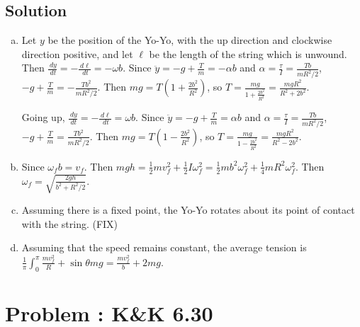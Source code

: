 \documentclass[solutions]{esg8012pset}
\renewcommand{\d}{\,d}
\begin{document}
\subsection{Solution}
  \begin{enumerate}[(a)]
    \item Let $y$ be the position of the Yo-Yo, with the up direction and clockwise direction positive, and let $\ell$ be the length of the string which is unwound.  Then $\frac{\d y}{\d t} = -\frac{\d \ell}{\d t} = -\omega b$.  Since $\ddot y = - g + \frac{T}{m} = -\alpha b$ and $\alpha = \frac{\tau}{I} = \frac{T b}{m R^2 / 2}$, $- g + \frac{T}{m} = -\frac{T b^2}{m R^2 / 2}$.  Then $m g = T\left(1 + \frac{2b^2}{R^2}\right)$, so $T = \frac{m g}{1 + \frac{2b^2}{R^2}} = \frac{m g R^2}{R^2 + 2b^2}$. \par
      Going up, $\frac{\d y}{\d t} = -\frac{\d \ell}{\d t} = \omega b$.  Since $\ddot y = -g + \frac{T}{m} = \alpha b$ and $\alpha = \frac{\tau}{I} = \frac{T b}{m R^2 / 2}$, $- g + \frac{T}{m} = \frac{T b^2}{m R^2 / 2}$.  Then $m g = T\left(1 - \frac{2b^2}{R^2}\right)$, so $T = \frac{m g}{1 - \frac{2b^2}{R^2}} = \frac{m g R^2}{R^2 - 2b^2}$.
    \item Since $\omega_f b = v_f$.  Then $m g h = \frac{1}{2} m v_f^2 + \frac{1}{2} I \omega_f^2 = \frac{1}{2} m b^2 \omega_f^2 + \frac{1}{4}mR^2 \omega_f^2$.  Then $\omega_f = \sqrt{\frac{2 g h}{b^2+R^2/2}}$.
    \item Assuming there is a fixed point, the Yo-Yo rotates about its point of contact with the string.  (FIX)
    \item Assuming that the speed remains constant, the average tension is $\frac{1}{\pi}\int_0^\pi \frac{m v_f^2}{R} + \sin\theta m g = \frac{m v_f^2}{b} + 2 m g$.
  \end{enumerate}
\section{Problem \thesection: K\&K 6.30}
\end{document}

